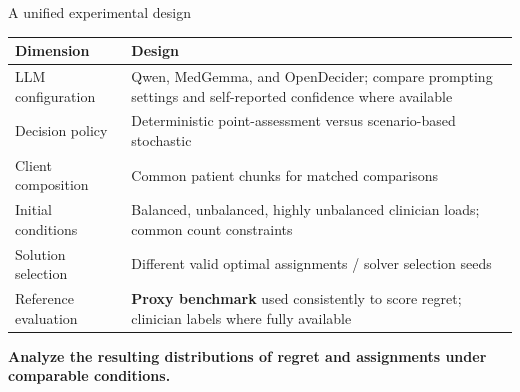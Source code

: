 \documentclass[aspectratio=169,11pt]{beamer}
\newcommand{\key}[1]{\textcolor{deepblue}{\textbf{#1}}}
\begin{document}
\begin{frame}{A unified experimental design}

\footnotesize

\renewcommand{\arraystretch}{1.47}

\begin{tabular}{p{.27\linewidth}p{.64\linewidth}}

\toprule

\textbf{Dimension} & \textbf{Design} \\

\midrule

LLM configuration &
Qwen, MedGemma, and OpenDecider; compare prompting settings and self-reported confidence where available \\

Decision policy &
Deterministic point-assessment versus scenario-based stochastic \\

Client composition &
Common patient chunks for matched comparisons \\

Initial conditions &
Balanced, unbalanced, highly unbalanced clinician loads; common count constraints \\

Solution selection &
Different valid optimal assignments / solver selection seeds \\

Reference evaluation &
\textbf{Proxy benchmark} used consistently to score regret; clinician labels where fully available \\

\bottomrule

\end{tabular}

\vspace{.23cm}

\begin{center}
\key{Analyze the resulting distributions of regret and assignments under comparable conditions.}
\end{center}

\end{frame}
\end{document}
